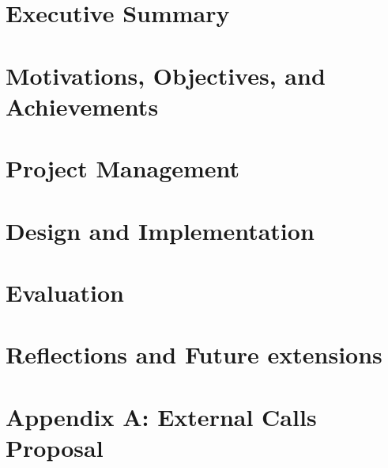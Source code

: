 \documentclass[12pt,twoside]{report}
\begin{document}


\clearpage{\pagestyle{empty}\cleardoublepage}
\setcounter{page}{1}
\pagestyle{fancy}

\tableofcontents
\clearpage{\pagestyle{empty}\cleardoublepage}
\setcounter{page}{1}
\fancyhead[LE,RO]{\slshape \rightmark}
\fancyhead[LO,RE]{\slshape \leftmark}

\chapter{Executive Summary}


\chapter{Motivations, Objectives, and Achievements}


\chapter{Project Management}


\chapter{Design and Implementation}
\label{chp:di}






\chapter{Evaluation}


\chapter{Reflections and Future extensions}


\printbibliography[heading=bibintoc]


\chapter*{Appendix A: External Calls Proposal}
\label{chp:appendix-a}

\end{document}
